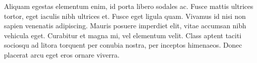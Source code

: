 Aliquam egestas elementum enim, id porta libero sodales ac. Fusce mattis ultrices tortor, eget iaculis nibh ultrices et. Fusce eget ligula quam. Vivamus id nisi non sapien venenatis adipiscing. Mauris posuere imperdiet elit, vitae accumsan nibh vehicula eget. Curabitur et magna mi, vel elementum velit. Class aptent taciti sociosqu ad litora torquent per conubia nostra, per inceptos himenaeos. Donec placerat arcu eget eros ornare viverra.

